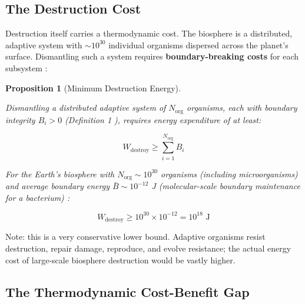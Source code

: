 \documentclass[11pt]{article}
\theoremstyle{plain}
\newtheorem{proposition}[theorem]{Proposition}
\theoremstyle{definition}
\theoremstyle{remark}
\let\origsubsection\subsection
\renewcommand{\subsection}{\needspace{7\baselineskip}\origsubsection}
\begin{document}
\subsection{The Destruction Cost}\label{the-destruction-cost}

Destruction itself carries a thermodynamic cost. The biosphere is a
distributed, adaptive system with \(\sim 10^{30}\) individual organisms
dispersed across the planet's surface. Dismantling such a system
requires \textbf{boundary-breaking costs} for each subsystem
\citep{TC-IV}:

\begin{proposition}[Minimum Destruction Energy]
\label{prop-minimum-destruction-energy}

Dismantling a distributed adaptive system of $N_{\text{org}}$ organisms, each with boundary integrity $B_i > 0$ (Definition 1 \citep{TC-IV}), requires energy expenditure of at least:

$$W_{\text{destroy}} \geq \sum_{i=1}^{N_{\text{org}}} B_i$$

For the Earth's biosphere with $N_{\text{org}} \sim 10^{30}$ organisms (including microorganisms) \citep{Whitman1998} and average boundary energy $\bar{B} \sim 10^{-12}$ J (molecular-scale boundary maintenance for a bacterium) \citep{Milo2015}:

$$W_{\text{destroy}} \geq 10^{30} \times 10^{-12} = 10^{18} \text{ J}$$
\end{proposition}

Note: this is a very conservative lower bound. Adaptive organisms resist
destruction, repair damage, reproduce, and evolve resistance; the actual
energy cost of large-scale biosphere destruction would be vastly higher.

\subsection{The Thermodynamic Cost-Benefit
Gap}\label{the-thermodynamic-cost-benefit-gap}
\end{document}
